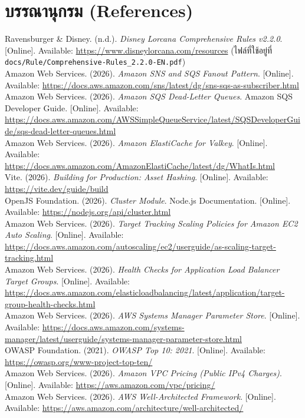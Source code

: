 \chapter*{บรรณานุกรม (References)}

\noindent [1] Ravensburger \& Disney. (n.d.). \textit{Disney Lorcana Comprehensive Rules v2.2.0}. [Online]. Available: \url{https://www.disneylorcana.com/resources} (ไฟล์ที่ใช้อยู่ที่ \nolinkurl{docs/Rule/Comprehensive-Rules_2.2.0-EN.pdf})\\[0.3cm]
\noindent [2] Amazon Web Services. (2026). \textit{Amazon SNS and SQS Fanout Pattern}. [Online]. Available: \url{https://docs.aws.amazon.com/sns/latest/dg/sns-sqs-as-subscriber.html}\\[0.3cm]
\noindent [3] Amazon Web Services. (2026). \textit{Amazon SQS Dead-Letter Queues}. Amazon SQS Developer Guide. [Online]. Available: \url{https://docs.aws.amazon.com/AWSSimpleQueueService/latest/SQSDeveloperGuide/sqs-dead-letter-queues.html}\\[0.3cm]
\noindent [4] Amazon Web Services. (2026). \textit{Amazon ElastiCache for Valkey}. [Online]. Available: \url{https://docs.aws.amazon.com/AmazonElastiCache/latest/dg/WhatIs.html}\\[0.3cm]
\noindent [5] Vite. (2026). \textit{Building for Production: Asset Hashing}. [Online]. Available: \url{https://vite.dev/guide/build}\\[0.3cm]
\noindent [6] OpenJS Foundation. (2026). \textit{Cluster Module}. Node.js Documentation. [Online]. Available: \url{https://nodejs.org/api/cluster.html}\\[0.3cm]
\noindent [7] Amazon Web Services. (2026). \textit{Target Tracking Scaling Policies for Amazon EC2 Auto Scaling}. [Online]. Available: \url{https://docs.aws.amazon.com/autoscaling/ec2/userguide/as-scaling-target-tracking.html}\\[0.3cm]
\noindent [8] Amazon Web Services. (2026). \textit{Health Checks for Application Load Balancer Target Groups}. [Online]. Available: \url{https://docs.aws.amazon.com/elasticloadbalancing/latest/application/target-group-health-checks.html}\\[0.3cm]
\noindent [9] Amazon Web Services. (2026). \textit{AWS Systems Manager Parameter Store}. [Online]. Available: \url{https://docs.aws.amazon.com/systems-manager/latest/userguide/systems-manager-parameter-store.html}\\[0.3cm]
\noindent [10] OWASP Foundation. (2021). \textit{OWASP Top 10: 2021}. [Online]. Available: \url{https://owasp.org/www-project-top-ten/}\\[0.3cm]
\noindent [11] Amazon Web Services. (2026). \textit{Amazon VPC Pricing (Public IPv4 Charges)}. [Online]. Available: \url{https://aws.amazon.com/vpc/pricing/}\\[0.3cm]
\noindent [12] Amazon Web Services. (2026). \textit{AWS Well-Architected Framework}. [Online]. Available: \url{https://aws.amazon.com/architecture/well-architected/}

